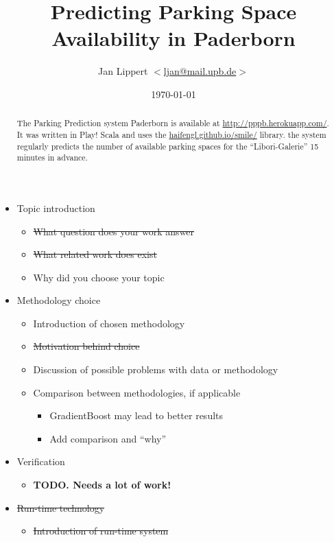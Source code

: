 \documentclass[journal,10pt]{IEEEtran}
\author{Jan Lippert \(<\)\href{mailto:ljan@mail.upb.de}{ljan@mail.upb.de}\(>\)}
\date{\today}
\begin{document}
\title{Predicting Parking Space Availability in Paderborn}
\maketitle

\begin{abstract}
The Parking Prediction system Paderborn is available at \url{http://pppb.herokuapp.com/}. It was written in Play! Scala and uses the \href{smile}{haifengl.github.io/smile/} library. the system regularly predicts the number of available parking spaces for the ``Libori-Galerie'' 15 minutes in advance.
\end{abstract}

\begin{itemize}
  \item Topic introduction
  \begin{itemize}
    \item \st{What question does your work answer}
    \item \st{What related work does exist}
    \item Why did you choose your topic
  \end{itemize}
  \item Methodology choice
  \begin{itemize}
    \item Introduction of chosen methodology
    \item \st{Motivation behind choice}
    \item Discussion of possible problems with data or methodology
    \item Comparison between methodologies, if applicable
    \begin{itemize}
      \item GradientBoost may lead to better results
      \item Add comparison and ``why''
    \end{itemize}
  \end{itemize}
  \item Verification
  \begin{itemize}
  	\item \textbf{TODO. Needs a lot of work!}
  \end{itemize}
  \item \st{Run-time technology}
  \begin{itemize}
    \item \st{Introduction of run-time system}

\end{itemize}
\end{itemize}
\end{document}
